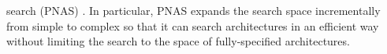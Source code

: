 \documentclass{article}
\begin{document}
search (PNAS) \cite{liu:pnas_google:DBLP:journals/corr/abs-1712-00559}.
In particular, PNAS expands the search space incrementally from simple to complex so that it can search architectures in an efficient way without limiting the search to the space of fully-specified architectures.
\end{document}
